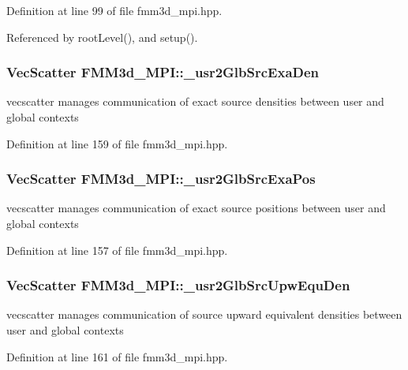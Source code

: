 Definition at line 99 of file fmm3d\_\-mpi.hpp.

Referenced by root\-Level(), and setup().
\subsubsection{\setlength{\rightskip}{0pt plus 5cm}Vec\-Scatter {\bf FMM3d\_\-MPI::\_\-usr2Glb\-Src\-Exa\-Den}\hspace{0.3cm}{\tt  [protected]}}\label{classFMM3d__MPI_40432f64c80ac41e3cc70e03f5dee9ae_40432f64c80ac41e3cc70e03f5dee9ae}


vecscatter manages communication of exact source densities between user and global contexts 

Definition at line 159 of file fmm3d\_\-mpi.hpp.
\subsubsection{\setlength{\rightskip}{0pt plus 5cm}Vec\-Scatter {\bf FMM3d\_\-MPI::\_\-usr2Glb\-Src\-Exa\-Pos}\hspace{0.3cm}{\tt  [protected]}}\label{classFMM3d__MPI_0802bd0cb48994d0ae3d4ba81ab264dd_0802bd0cb48994d0ae3d4ba81ab264dd}


vecscatter manages communication of exact source positions between user and global contexts 

Definition at line 157 of file fmm3d\_\-mpi.hpp.
\subsubsection{\setlength{\rightskip}{0pt plus 5cm}Vec\-Scatter {\bf FMM3d\_\-MPI::\_\-usr2Glb\-Src\-Upw\-Equ\-Den}\hspace{0.3cm}{\tt  [protected]}}\label{classFMM3d__MPI_16ae9a7a3e5b0ee4fb8f73f7edc0a83e_16ae9a7a3e5b0ee4fb8f73f7edc0a83e}


vecscatter manages communication of source upward equivalent densities between user and global contexts 

Definition at line 161 of file fmm3d\_\-mpi.hpp.
